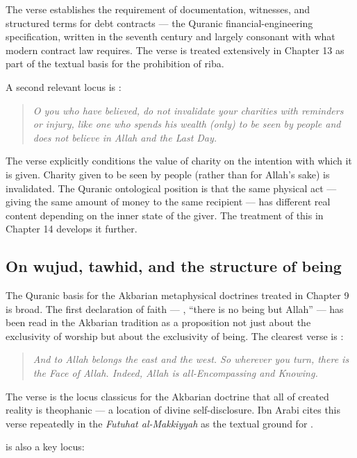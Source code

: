 The verse establishes the requirement of documentation, witnesses,
and structured terms for debt contracts --- the Quranic
financial-engineering specification, written in the seventh century
and largely consonant with what modern contract law requires. The
verse is treated extensively in Chapter 13 as part of the textual
basis for the prohibition of riba.

A second relevant locus is :

\begin{quote}
\textit{O you who have believed, do not invalidate your charities
with reminders or injury, like one who spends his wealth (only) to
be seen by people and does not believe in Allah and the Last Day.}
\end{quote}

The verse explicitly conditions the value of charity on the
intention with which it is given. Charity given to be seen by people
(rather than for Allah's sake) is invalidated. The Quranic
ontological position is that the same physical act --- giving the
same amount of money to the same recipient --- has different real
content depending on the inner state of the giver. The treatment of
this in Chapter 14 develops it further.

\subsection{On wujud, tawhid, and the structure of being}

The Quranic basis for the Akbarian metaphysical doctrines treated in
Chapter 9 is broad. The first declaration of faith --- , ``there is no being but Allah'' --- has been read
in the Akbarian tradition as a proposition not just about the
exclusivity of worship but about the exclusivity of being. The
clearest verse is :

\begin{quote}
\textit{And to Allah belongs the east and the west. So wherever you
turn, there is the Face of Allah. Indeed, Allah is all-Encompassing
and Knowing.}
\end{quote}

The verse is the locus classicus for the Akbarian doctrine that all
of created reality is theophanic --- a location of divine
self-disclosure. Ibn Arabi cites this verse repeatedly in the
\textit{Futuhat al-Makkiyyah} as the textual ground for
.

 is also a key locus:

